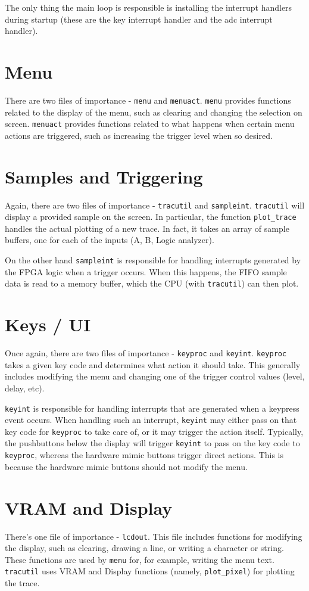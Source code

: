 The only thing the main loop is responsible is installing the interrupt handlers during startup (these are the key interrupt handler and the adc interrupt handler).

\section{Menu}
There are two files of importance - \verb=menu= and \verb=menuact=. \verb=menu= provides functions related to the display of the menu, such as clearing and changing the selection on screen. \verb=menuact= provides functions related to what happens when certain menu actions are triggered, such as increasing the trigger level when so desired.

\section{Samples and Triggering}
Again, there are two files of importance - \verb=tracutil= and \verb=sampleint=. \verb=tracutil= will display a provided sample on the screen. In particular, the function \verb=plot_trace= handles the actual plotting of a new trace. In fact, it takes an array of sample buffers, one for each of the inputs (A, B, Logic analyzer).

On the other hand \verb=sampleint= is responsible for handling interrupts generated by the FPGA logic when a trigger occurs. When this happens, the FIFO sample data is read to a memory buffer, which the CPU (with \verb=tracutil=) can then plot.

\section{Keys / UI}
Once again, there are two files of importance - \verb=keyproc= and \verb=keyint=. \verb=keyproc= takes a given key code and determines what action it should take. This generally includes modifying the menu and changing one of the trigger control values (level, delay, etc).

\verb=keyint= is responsible for handling interrupts that are generated when a keypress event occurs. When handling such an interrupt, \verb=keyint= may either pass on that key code for \verb=keyproc= to take care of, or it may trigger the action itself. Typically, the pushbuttons below the display will trigger \verb=keyint= to pass on the key code to \verb=keyproc=, whereas the hardware mimic buttons trigger direct actions. This is because the hardware mimic buttons should not modify the menu.

\section{VRAM and Display}
There's one file of importance - \verb=lcdout=. This file includes functions for modifying the display, such as clearing, drawing a line, or writing a character or string. These functions are used by \verb=menu= for, for example, writing the menu text. \verb=tracutil= uses VRAM and Display functions (namely, \verb=plot_pixel=) for plotting the trace.
